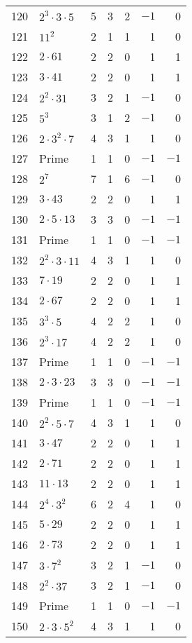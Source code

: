 \documentclass[12pt]{article}
\begin{document}
\begin{tabular}{|r|l|r|r|r|r|r|}
120 & $2^3 \cdot 3 \cdot 5$ & 5 & 3 & 2 & $-1$ & 0 \\
121 & $11^2$ & 2 & 1 & 1 & 1 & 0 \\
122 & $2 \cdot 61$ & 2 & 2 & 0 & 1 & 1 \\
123 & $3 \cdot 41$ & 2 & 2 & 0 & 1 & 1 \\
124 & $2^2 \cdot 31$ & 3 & 2 & 1 & $-1$ & 0 \\
125 & $5^3$ & 3 & 1 & 2 & $-1$ & 0 \\
126 & $2 \cdot 3^2 \cdot 7$ & 4 & 3 & 1 & 1 & 0 \\
127 & Prime & 1 & 1 & 0 & $-1$ & $-1$ \\
128 & $2^7$ & 7 & 1 & 6 & $-1$ & 0 \\
129 & $3 \cdot 43$ & 2 & 2 & 0 & 1 & 1 \\
130 & $2 \cdot 5 \cdot 13$ & 3 & 3 & 0 & $-1$ & $-1$ \\
131 & Prime & 1 & 1 & 0 & $-1$ & $-1$ \\
132 & $2^2 \cdot 3 \cdot 11$ & 4 & 3 & 1 & 1 & 0 \\
133 & $7 \cdot 19$ & 2 & 2 & 0 & 1 & 1 \\
134 & $2 \cdot 67$ & 2 & 2 & 0 & 1 & 1 \\
135 & $3^3 \cdot 5$ & 4 & 2 & 2 & 1 & 0 \\
136 & $2^3 \cdot 17$ & 4 & 2 & 2 & 1 & 0 \\
137 & Prime & 1 & 1 & 0 & $-1$ & $-1$ \\
138 & $2 \cdot 3 \cdot 23$ & 3 & 3 & 0 & $-1$ & $-1$ \\
139 & Prime & 1 & 1 & 0 & $-1$ & $-1$ \\
140 & $2^2 \cdot 5 \cdot 7$ & 4 & 3 & 1 & 1 & 0 \\
141 & $3 \cdot 47$ & 2 & 2 & 0 & 1 & 1 \\
142 & $2 \cdot 71$ & 2 & 2 & 0 & 1 & 1 \\
143 & $11 \cdot 13$ & 2 & 2 & 0 & 1 & 1 \\
144 & $2^4 \cdot 3^2$ & 6 & 2 & 4 & 1 & 0 \\
145 & $5 \cdot 29$ & 2 & 2 & 0 & 1 & 1 \\
146 & $2 \cdot 73$ & 2 & 2 & 0 & 1 & 1 \\
147 & $3 \cdot 7^2$ & 3 & 2 & 1 & $-1$ & 0 \\
148 & $2^2 \cdot 37$ & 3 & 2 & 1 & $-1$ & 0 \\
149 & Prime & 1 & 1 & 0 & $-1$ & $-1$ \\
150 & $2 \cdot 3 \cdot 5^2$ & 4 & 3 & 1 & 1 & 0 \\

\end{tabular}
\end{document}
